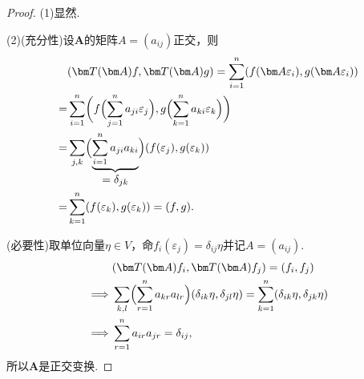\begin{proof}
	(1)显然.

	(2)(充分性)设$\bm A$的矩阵$A=(a_{ij})$正交，则
	\begin{align*}
		  & {}(\bm T(\bm A)f,\bm T(\bm A)g)=\sum_{i=1}^n(f(\bm A\varepsilon_i),g(\bm A\varepsilon_i))                                 \\
		= & {}\sum_{i=1}^n\biggl(f\Bigl(\sum_{j=1}^na_{ji}\varepsilon_j\Bigr),g\Bigl(\sum_{k=1}^na_{ki}\varepsilon_k\Bigr)\biggr)     \\
		= & {}\sum_{j,k}\Bigl(\underbrace{\sum_{i=1}^na_{ji}a_{ki}}_{\textstyle=\delta_{jk}}\Bigr)(f(\varepsilon_j),g(\varepsilon_k)) \\
		= & {}\sum_{k=1}^n(f(\varepsilon_k),g(\varepsilon_k))=(f,g).
	\end{align*}

	(必要性)取单位向量$\eta\in V$，命$f_i(\varepsilon_j)=\delta_{ij}\eta$并记$A=(a_{ij})$.
	\begin{align*}
		         & {}(\bm T(\bm A)f_i,\bm T(\bm A)f_j)=(f_i,f_j)                                                                                   \\
		\implies & {}\sum_{k,l}\Bigl(\sum_{r=1}^na_{kr}a_{lr}\Bigr)(\delta_{ik}\eta,\delta_{jl}\eta)=\sum_{k=1}^n(\delta_{ik}\eta,\delta_{jk}\eta) \\
		\implies & {}\sum_{r=1}^na_{ir}a_{jr}=\delta_{ij},
	\end{align*}
	所以$\bm A$是正交变换.
\end{proof}
